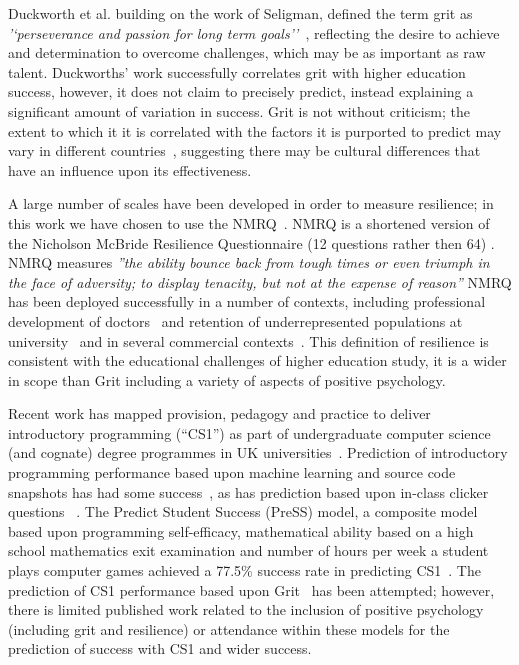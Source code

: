 \documentclass[sigconf]{acmart}
\begin{document}
Duckworth et al. building on the work of Seligman, defined the term grit as {\em'`perseverance and passion for long term goals''~\cite[p.~1087]{Duckworth2007}}, reflecting the desire to achieve and determination to overcome challenges, which may be as important as raw talent. Duckworths' work successfully correlates grit with higher education success, however, it does not claim to precisely predict, instead explaining a significant amount of variation in success. Grit is not without criticism; the extent to which it it is correlated with the factors it is purported to predict may vary in different countries~\cite{Datu2016, Tyumeneva2017}, suggesting there may be cultural differences that have an influence upon its effectiveness. 

A large number of scales have been developed in order to measure resilience; in this work we have chosen to use the NMRQ~\cite{Clarke2010}. NMRQ is a shortened version of the Nicholson McBride Resilience Questionnaire (12 questions rather then 64) \cite{Clarke2010}. NMRQ measures {\em''the ability bounce back from tough times or even triumph in the face of adversity; to display tenacity, but not at the expense of reason''\cite[p.~1]{Clarke2010}} NMRQ has been deployed successfully in a number of contexts, including professional development of doctors~\cite{Tregoningg251} and retention of underrepresented populations at university~\cite{Daniels2015} and in several commercial contexts~\cite{Clarke2010}. This definition of resilience is consistent with the educational challenges of higher education study, it is a wider in scope than Grit including a variety of aspects of positive psychology.

Recent work has mapped provision, pedagogy and practice to deliver introductory programming (``CS1'') as part of undergraduate computer science (and cognate) degree programmes in UK universities~\cite{davenport-et-al:latice2016,murphy-et-al:programming2017,simon-et-al:sigcse2018}. Prediction of introductory programming performance based upon machine learning and source code snapshots has had some success~\cite{Ahadi:2015:EML:2787622.2787717,Castro-Wunsch:2017:ENN:3017680.3017792}, as has prediction based upon in-class clicker questions ~\cite{Liao:2016:LEI:2960310.2960315,Liao:2019:RML:3308443.3277569}. The Predict Student Success (PreSS) model, a composite model based upon programming self-efficacy, mathematical ability based on a high school mathematics exit examination and number of hours per week a student plays computer games achieved a 77.5\% success rate in predicting CS1~\cite{Quille:2018:PPS:3197091.3197101}. The prediction of CS1 performance based upon Grit~\cite{Sigurdson:2018:EGC:3279720.3279743} has been attempted; however, there is limited published work related to the inclusion of positive psychology (including grit and resilience) or attendance within these models for the prediction of success with CS1 and wider success.
\end{document}
